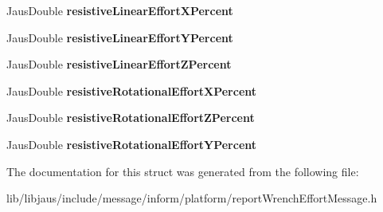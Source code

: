 \begin{DoxyCompactItemize}
\item 
\hypertarget{struct_report_wrench_effort_message_struct_af7aadd3fc7f8093dcca172074b5facb0}{\-Jaus\-Double {\bfseries resistive\-Linear\-Effort\-X\-Percent}}\label{struct_report_wrench_effort_message_struct_af7aadd3fc7f8093dcca172074b5facb0}

\item 
\hypertarget{struct_report_wrench_effort_message_struct_a4f36dd4cc9220857429ff03ea79b750c}{\-Jaus\-Double {\bfseries resistive\-Linear\-Effort\-Y\-Percent}}\label{struct_report_wrench_effort_message_struct_a4f36dd4cc9220857429ff03ea79b750c}

\item 
\hypertarget{struct_report_wrench_effort_message_struct_a0841c10bac1c8bb0c205b924930f5aac}{\-Jaus\-Double {\bfseries resistive\-Linear\-Effort\-Z\-Percent}}\label{struct_report_wrench_effort_message_struct_a0841c10bac1c8bb0c205b924930f5aac}

\item 
\hypertarget{struct_report_wrench_effort_message_struct_a1c1a6c3f3031bb9f7eacc9f1de1853a0}{\-Jaus\-Double {\bfseries resistive\-Rotational\-Effort\-X\-Percent}}\label{struct_report_wrench_effort_message_struct_a1c1a6c3f3031bb9f7eacc9f1de1853a0}

\item 
\hypertarget{struct_report_wrench_effort_message_struct_a186da07fc58ced2221101662e4853554}{\-Jaus\-Double {\bfseries resistive\-Rotational\-Effort\-Z\-Percent}}\label{struct_report_wrench_effort_message_struct_a186da07fc58ced2221101662e4853554}

\item 
\hypertarget{struct_report_wrench_effort_message_struct_ac15e971a3409ca5c58bfa5a88d3feb60}{\-Jaus\-Double {\bfseries resistive\-Rotational\-Effort\-Y\-Percent}}\label{struct_report_wrench_effort_message_struct_ac15e971a3409ca5c58bfa5a88d3feb60}

\end{DoxyCompactItemize}


\-The documentation for this struct was generated from the following file\-:\begin{DoxyCompactItemize}
\item 
lib/libjaus/include/message/inform/platform/report\-Wrench\-Effort\-Message.\-h\end{DoxyCompactItemize}
